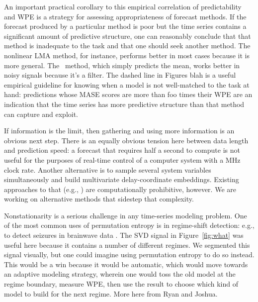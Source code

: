 An important practical corollary to this empirical correlation of
predictability and WPE is a strategy for assessing appropriateness of
forecast methods.  If the forecast produced by a particular method is
poor but the time series contains a significant amount of predictive
structure, one can reasonably conclude that that method is inadequate
to the task and that one should seek another method.  The nonlinear
LMA method, for instance, performs better in most cases because it is
more general.  The \naive ~method, which simply predicts the mean,
works better in noisy signals because it's a filter.  The dashed line
in Figures blah is a useful empirical guideline for knowing when a
model is not well-matched to the task at hand: predictions whose MASE
scores are more than foo times their WPE are an indication that the
time series has more predictive structure than that method can capture
and exploit.

If information is the limit, then gathering and using more information
is an obvious next step.  There is an equally obvious tension here
between data length and prediction speed: a forecast that requires
half a second to compute is not useful for the purposes of real-time
control of a computer system with a MHz clock rate.  Another
alternative is to sample several system variables simultaneously and
build multivariate delay-coordinate embeddings.  Existing approaches
to that (e.g., \cite{cao-multivariate-embedding,deyle-sugihara2011})
are computationally prohibitive, however.  We are working on
alternative methods that sidestep that complexity.


Nonstationarity is a serious challenge in any time-series modeling
problem.  One of the most common uses of permutation entropy is in
regime-shift detection: e.g., to detect seizures in brainwave data
\cite{cao2004det}.  The SVD signal in Figure~\ref{fig:what} was useful
here because it contains a number of different regimes.  We segmented
this signal visually, but one could imagine using permutation entropy
to do so instead.  This would be a win because it would be automatic,
which would move towards an adaptive modeling strategy, wherein one
would toss the old model at the regime boundary, measure WPE, then use
the result to choose which kind of model to build for the next regime.
More here from Ryan and Joshua.

